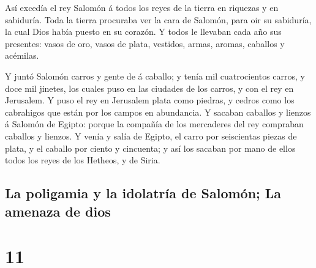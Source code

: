  Así excedía el rey Salomón á todos los reyes de la tierra
en riquezas y en sabiduría.  Toda la tierra procuraba ver
la cara de Salomón, para oir su sabiduría, la cual Dios había puesto en
su corazón.  Y todos le llevaban cada año sus presentes:
vasos de oro, vasos de plata, vestidos, armas, aromas, caballos y
acémilas.

 Y juntó Salomón carros y gente de á caballo; y tenía mil
cuatrocientos carros, y doce mil jinetes, los cuales puso en las
ciudades de los carros, y con el rey en Jerusalem.  Y puso
el rey en Jerusalem plata como piedras, y cedros como los cabrahigos que
están por los campos en abundancia.  Y sacaban caballos y
lienzos á Salomón de Egipto: porque la compañía de los mercaderes del
rey compraban caballos y lienzos.  Y venía y salía de
Egipto, el carro por seiscientas piezas de plata, y el caballo por
ciento y cincuenta; y así los sacaban por mano de ellos todos los reyes
de los Hetheos, y de Siria.

\hypertarget{la-poligamia-y-la-idolatruxeda-de-salomuxf3n-la-amenaza-de-dios}{%
\subsection{La poligamia y la idolatría de Salomón; La amenaza de
dios}\label{la-poligamia-y-la-idolatruxeda-de-salomuxf3n-la-amenaza-de-dios}}

\hypertarget{section-10}{%
\section{11}\label{section-10}}

